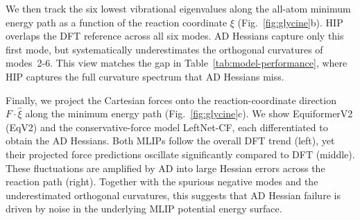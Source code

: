 \documentclass[pdflatex,sn-mathphys-num]{sn-jnl}%
\theoremstyle{thmstyleone}%
\theoremstyle{thmstyletwo}%
\theoremstyle{thmstylethree}%
\begin{document}
We then track the six lowest vibrational eigenvalues along the all-atom minimum energy path as a function of the reaction coordinate $\xi$ (Fig.~\ref{fig:glycine}b). HIP overlaps the DFT reference across all six modes. AD Hessians capture only this first mode, but systematically underestimates the orthogonal curvatures of modes~2-6. This view matches the gap in Table~\ref{tab:model-performance}, where HIP captures the full curvature spectrum that AD Hessians miss.

Finally, we project the Cartesian forces onto the reaction-coordinate direction $F\cdot\widehat{\xi}$ along the minimum energy path (Fig.~\ref{fig:glycine}c). We show EquiformerV2 (EqV2) and the conservative-force model LeftNet-CF, each differentiated to obtain the AD Hessians. Both MLIPs follow the overall DFT trend (left), yet their projected force predictions oscillate significantly compared to DFT (middle). These fluctuations are amplified by AD into large Hessian errors across the reaction path (right).
Together with the spurious negative modes and the underestimated orthogonal curvatures, this suggests that AD Hessian failure is driven by noise in the underlying MLIP potential energy surface.
\end{document}
